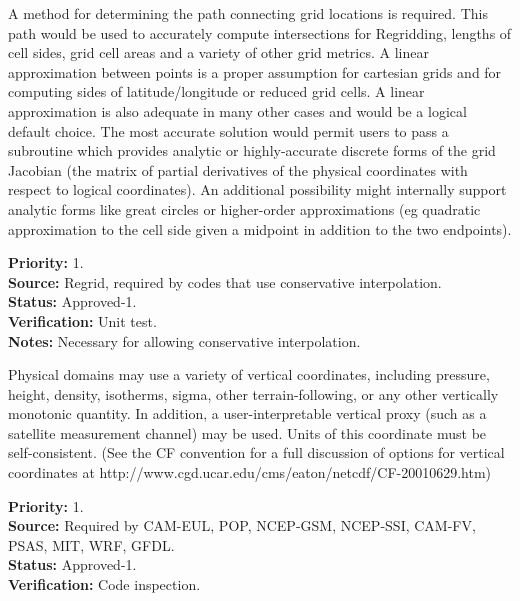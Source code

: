 
A method for determining the path connecting grid locations 
is required.  This path would be used to accurately compute
intersections for Regridding, lengths of cell sides, grid
cell areas and a variety of other grid metrics.  A linear 
approximation between points is a proper assumption for 
cartesian grids and for computing sides of latitude/longitude
or reduced grid cells.  A linear approximation is also 
adequate in many other cases and would be a logical default choice. 
The most accurate solution would permit users to pass a 
subroutine which provides analytic or highly-accurate discrete 
forms of the grid Jacobian (the matrix of partial derivatives of 
the physical coordinates with respect to logical coordinates).  An 
additional possibility might internally support analytic forms like 
great circles or higher-order approximations (eg quadratic
approximation to the cell side given a midpoint in addition
to the two endpoints).

\begin{reqlist}
{\bf Priority:} 1. \\
{\bf Source:} Regrid, required by codes that use conservative interpolation. \\
{\bf Status:} Approved-1. \\
{\bf Verification:} Unit test.\\
{\bf Notes:} Necessary for allowing conservative interpolation.
\end{reqlist}



Physical domains may use a variety of vertical coordinates, including pressure,
height, density, isotherms, sigma, other terrain-following, or any other
vertically monotonic quantity.  In addition, a user-interpretable vertical
proxy (such as a satellite measurement channel) may be used.  Units of this
coordinate must be self-consistent.  (See the CF convention for a full
discussion of options for vertical coordinates at
http://www.cgd.ucar.edu/cms/eaton/netcdf/CF-20010629.htm)
\begin{reqlist}
{\bf Priority:} 1. \\
{\bf Source:} Required by CAM-EUL, POP, NCEP-GSM, NCEP-SSI, CAM-FV, PSAS, MIT, WRF, GFDL. \\
{\bf Status:} Approved-1. \\
{\bf Verification:} Code inspection.
\end{reqlist}

